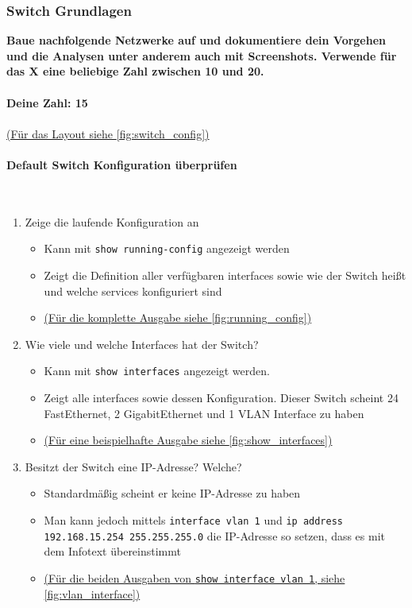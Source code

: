 \documentclass{article}
\newcommand{\paragraphlb}[1]{\paragraph{#1}\mbox{}\\}{}
\begin{document}
	\subsubsection{Switch Grundlagen}
	{\color{red} \textbf{Baue nachfolgende Netzwerke auf und dokumentiere dein Vorgehen und die Analysen unter anderem auch mit Screenshots. Verwende für das X eine beliebige Zahl zwischen 10 und 20.}} \\ \\
	{\color{red} \textbf{Deine Zahl: 15}} \\ \\
	\hyperref[fig:switch_config]{(Für das Layout siehe \ref{fig:switch_config})}
	\paragraphlb{Default Switch Konfiguration überprüfen}
	\label{sub:switch_config}
	\begin{enumerate}
		\item{Zeige die laufende Konfiguration an}
		\begin{itemize}
			\item{Kann mit \texttt{show running-config} angezeigt werden }
			\item{Zeigt die Definition aller verfügbaren interfaces sowie wie der Switch heißt und welche services konfiguriert sind}
			\item[]{\hyperref[fig:running_config]{(Für die komplette Ausgabe siehe \ref{fig:running_config})}}
		\end{itemize}
		\item{Wie viele und welche Interfaces hat der Switch?}
		\begin{itemize}
			\item{Kann mit \texttt{show interfaces} angezeigt werden.}
			\item{Zeigt alle interfaces sowie dessen Konfiguration. Dieser Switch scheint 24 FastEthernet, 2 GigabitEthernet und 1 VLAN Interface zu haben}
			\item[]{\hyperref[fig:show_interfaces]{(Für eine beispielhafte Ausgabe siehe \ref{fig:show_interfaces})}}
		\end{itemize}
		\item{Besitzt der Switch eine IP-Adresse? Welche?}
		\begin{itemize}
			\item{Standardmäßig scheint er keine IP-Adresse zu haben}
			\item{Man kann jedoch mittels \texttt{interface vlan 1} und \texttt{ip address 192.168.15.254 255.255.255.0} die IP-Adresse so setzen, dass es mit dem Infotext übereinstimmt}
			\item[]{\hyperref[fig:vlan_interface]{(Für die beiden Ausgaben von \texttt{show interface vlan 1}, siehe \ref{fig:vlan_interface})}}

\end{itemize}
\end{enumerate}
\end{document}
